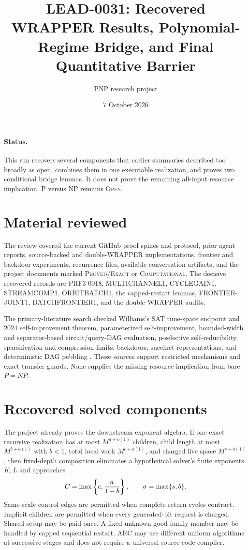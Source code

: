 \documentclass[11pt]{article}
\title{LEAD-0031: Recovered WRAPPER Results, Polynomial-Regime Bridge, and Final Quantitative Barrier}
\author{PNP research project}
\date{7 October 2026}
\begin{document}
\maketitle

\paragraph{Status.}
This run recovers several components that earlier summaries described too
broadly as open, combines them in one executable realization, and proves two
conditional bridge lemmas.  It does not prove the remaining all-input
resource implication.  P versus NP remains \textsc{Open}.

\section{Material reviewed}
The review covered the current GitHub proof spines and protocol, prior agent
reports, source-backed and double-WRAPPER implementations, frontier and
backdoor experiments, recurrence files, available conversation artifacts,
and the project documents marked \textsc{Proved/Exact} or
\textsc{Computational}.  The decisive recovered records are PRF3-0018,
MULTICHANNEL1, CYCLEGAIN1, STREAMCOMP1, ORBITBATCH1, the capped-restart
lemmas, FRONTIER-JOINT1, BATCHFRONTIER1, and the double-WRAPPER audits.

The primary-literature search checked Williams's SAT time-space endpoint and
2024 self-improvement theorem, parameterized self-improvement, bounded-width
and separator-based circuit/query-DAG evaluation, p-selective
self-reducibility, sparsification and compression limits, backdoors,
succinct representations, and deterministic DAG pebbling
\cite{williams2010,williams2024,jansensarma,gharibianrudolph,
buhrmantorenvliet,paultarjan}.  These sources support restricted mechanisms
and exact transfer guards.  None supplies the missing resource implication
from bare $P=NP$.

\section{Recovered solved components}
The project already proves the downstream exponent algebra.  If one exact
recursive realization has at most $M^{a+o(1)}$ children, child length at most
$M^{b+o(1)}$ with $b<1$, total local work $M^{c+o(1)}$, and charged live
space $M^{s+o(1)}$, then fixed-depth composition eliminates a hypothetical
solver's finite exponents $K,L$ and approaches
\[
 C=\max\left\{c,{a\over1-b}\right\},
 \qquad \sigma=\max\{s,b\}.
\]
Same-scale control edges are permitted when complete return cycles contract.
Implicit children are permitted when every generated-bit request is charged.
Shared setup may be paid once.  A fixed unknown good family member may be
handled by capped sequential restart.  ARC may use different uniform
algorithms at successive stages and does not require a universal source-code
compiler.
\end{document}
